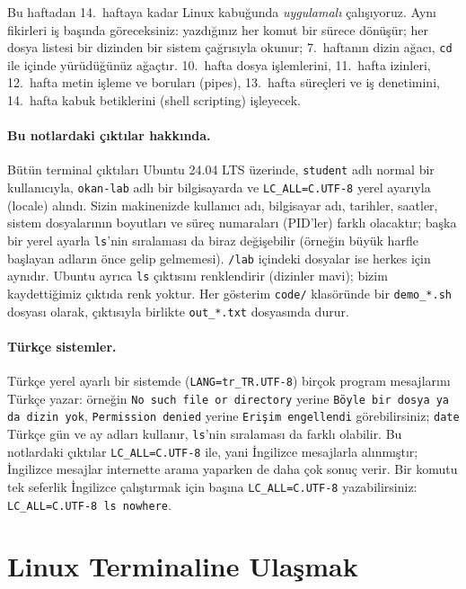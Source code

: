 \documentclass[11pt,a4paper]{article}
\newcommand{\cmd}[1]{\texttt{#1}}
\begin{document}
Bu haftadan 14.\ haftaya kadar Linux kabuğunda \emph{uygulamalı} çalışıyoruz. Aynı fikirleri iş başında göreceksiniz: yazdığınız her komut bir sürece dönüşür; her dosya listesi bir dizinden bir sistem çağrısıyla okunur; 7.\ haftanın dizin ağacı, \cmd{cd} ile içinde yürüdüğünüz ağaçtır. 10.\ hafta dosya işlemlerini, 11.\ hafta izinleri, 12.\ hafta metin işleme ve boruları (pipes), 13.\ hafta süreçleri ve iş denetimini, 14.\ hafta kabuk betiklerini (shell scripting) işleyecek.

\paragraph{Bu notlardaki çıktılar hakkında.} Bütün terminal çıktıları Ubuntu 24.04 LTS üzerinde, \texttt{student} adlı normal bir kullanıcıyla, \texttt{okan-lab} adlı bir bilgisayarda ve \texttt{LC\_ALL=C.UTF-8} yerel ayarıyla (locale) alındı. Sizin makinenizde kullanıcı adı, bilgisayar adı, tarihler, saatler, sistem dosyalarının boyutları ve süreç numaraları (PID'ler) farklı olacaktır; başka bir yerel ayarla \cmd{ls}'nin sıralaması da biraz değişebilir (örneğin büyük harfle başlayan adların önce gelip gelmemesi). \texttt{\tl/lab} içindeki dosyalar ise herkes için aynıdır. Ubuntu ayrıca \cmd{ls} çıktısını renklendirir (dizinler mavi); bizim kaydettiğimiz çıktıda renk yoktur. Her gösterim \texttt{code/} klasöründe bir \texttt{demo\_*.sh} dosyası olarak, çıktısıyla birlikte \texttt{out\_*.txt} dosyasında durur.

\paragraph{Türkçe sistemler.} Türkçe yerel ayarlı bir sistemde (\texttt{LANG=tr\_TR.UTF-8}) birçok program mesajlarını Türkçe yazar: örneğin \texttt{No such file or directory} yerine \texttt{Böyle bir dosya ya da dizin yok}, \texttt{Permission denied} yerine \texttt{Erişim engellendi} görebilirsiniz; \cmd{date} Türkçe gün ve ay adları kullanır, \cmd{ls}'nin sıralaması da farklı olabilir. Bu notlardaki çıktılar \texttt{LC\_ALL=C.UTF-8} ile, yani İngilizce mesajlarla alınmıştır; İngilizce mesajlar internette arama yaparken de daha çok sonuç verir. Bir komutu tek seferlik İngilizce çalıştırmak için başına \texttt{LC\_ALL=C.UTF-8} yazabilirsiniz: \cmd{LC\_ALL=C.UTF-8 ls nowhere}.

\section{Linux Terminaline Ulaşmak}
\label{sec:getlinux}
\end{document}
